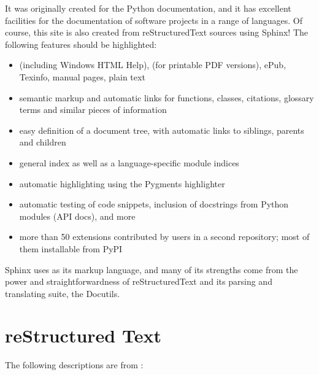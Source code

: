 \documentclass[letterpaper,12pt,english]{sphinxmanual}
\begin{document}
It was originally created for the Python documentation, and it has excellent facilities for the documentation of software projects in a range of languages. Of course, this site is also created from reStructuredText sources using Sphinx! The following features should be highlighted:
\begin{itemize}
\item {} 
  (including Windows HTML Help),  (for printable PDF versions), ePub, Texinfo, manual pages, plain text

\item {} 
 semantic markup and automatic links for functions, classes, citations, glossary terms and similar pieces of information

\item {} 
 easy definition of a document tree, with automatic links to siblings, parents and children

\item {} 
 general index as well as a language-specific module indices

\item {} 
 automatic highlighting using the Pygments highlighter

\item {} 
 automatic testing of code snippets, inclusion of docstrings from Python modules (API docs), and more

\item {} 
 more than 50 extensions contributed by users in a second repository; most of them installable from PyPI

\end{itemize}

Sphinx uses  as its markup language, and many of its strengths come from the power and straightforwardness of reStructuredText and its parsing and translating suite, the Docutils.


\section{reStructured Text}
\label{\detokenize{intro:restructured-text}}
The following descriptions are from :
\end{document}
